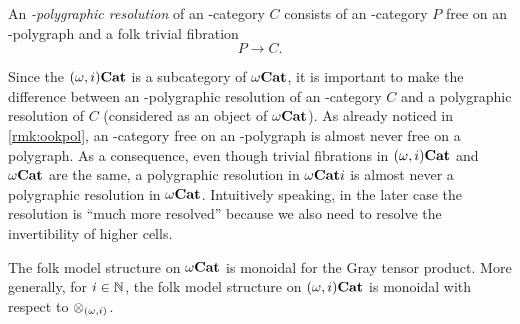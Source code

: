 \documentclass{amsart}
\begin{document}
 
  \begin{definition}
    An \emph{\nbd-polygraphic resolution} of an
    \nbd-category $C$ consists of an \nbd-category $P$ free on an \nbd-polygraph and a folk trivial
    fibration
    \[
      P \to C.
    \]
  \end{definition}
  \begin{remark}\label{rmk:ookrespol}
    Since the $(\omega,i)\mathbf{Cat}$ is a subcategory of ${\omega}\mathbf{Cat}$, it is
    important
    to make the difference between an \nbd-polygraphic resolution of an
    \nbd-category $C$
    and a polygraphic resolution of $C$ (considered as an object of
    ${\omega}\mathbf{Cat}$). As already noticed in \cref{rmk:ookpol}, an
    \oo\nbd-category free on an \nbd-polygraph is almost never
    free on a polygraph. As a consequence, even though trivial
    fibrations in $(\omega,i)\mathbf{Cat}$ and ${\omega}\mathbf{Cat}$ are the same, a
    polygraphic resolution in ${\omega}\mathbf{Cat}{i}$ is almost never a polygraphic
    resolution in ${\omega}\mathbf{Cat}$. Intuitively speaking, in the later case the
    resolution is ``much more resolved'' because we also need to
    resolve the invertibility of higher cells.
  \end{remark}
    \begin{proposition}\cite[Theorems 5.6 \& 6.21]{aralucas:folmon}\label{folkmonoidal}
    The folk model structure on ${\omega}\mathbf{Cat}$ is monoidal for the Gray
    tensor product. More generally, for $i \in \mathbb N$, the folk model
    structure on $(\omega,i)\mathbf{Cat}$ is monoidal with respect to
    $\operatorname{\otimes}_{(\omega,i)}$. 
  \end{proposition}
    
\end{document}
